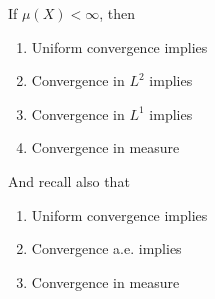 \documentclass[11pt,a4paper]{report}
\theoremstyle{plain}
\theoremstyle{definition}
\theoremstyle{remark}
\begin{document}
If $\mu(X) < \infty$, then
\begin{enumerate}
    \item Uniform convergence implies
    \item Convergence in $L^2$ implies
    \item Convergence in $L^1$ implies
    \item Convergence in measure
\end{enumerate}
And recall also that
\begin{enumerate}
    \item Uniform convergence implies
    \item Convergence a.e. implies
    \item Convergence in measure
\end{enumerate}
\end{document}

